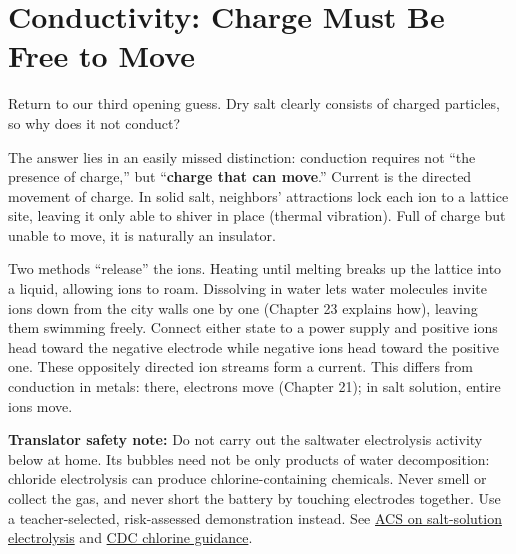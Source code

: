 \section{Conductivity: Charge Must Be Free to Move}

Return to our third opening guess. Dry salt clearly consists of charged particles, so why does it not conduct?

The answer lies in an easily missed distinction: conduction requires not ``the presence of charge,'' but ``\textbf{charge that can move}.'' Current is the directed movement of charge. In solid salt, neighbors' attractions lock each ion to a lattice site, leaving it only able to shiver in place (thermal vibration). Full of charge but unable to move, it is naturally an insulator.

Two methods ``release'' the ions. Heating until melting breaks up the lattice into a liquid, allowing ions to roam. Dissolving in water lets water molecules invite ions down from the city walls one by one (Chapter 23 explains how), leaving them swimming freely. Connect either state to a power supply and positive ions head toward the negative electrode while negative ions head toward the positive one. These oppositely directed ion streams form a current. This differs from conduction in metals: there, electrons move (Chapter 21); in salt solution, entire ions move.

\textbf{Translator safety note:} Do not carry out the saltwater electrolysis activity below at home. Its bubbles need not be only products of water decomposition: chloride electrolysis can produce chlorine-containing chemicals. Never smell or collect the gas, and never short the battery by touching electrodes together. Use a teacher-selected, risk-assessed demonstration instead. See \href{https://www.acs.org/molecule-of-the-week/archive/s/sodium-hypochlorite.html}{ACS on salt-solution electrolysis} and \href{https://www.cdc.gov/chemical-emergencies/chemical-fact-sheets/chlorine.html}{CDC chlorine guidance}.

